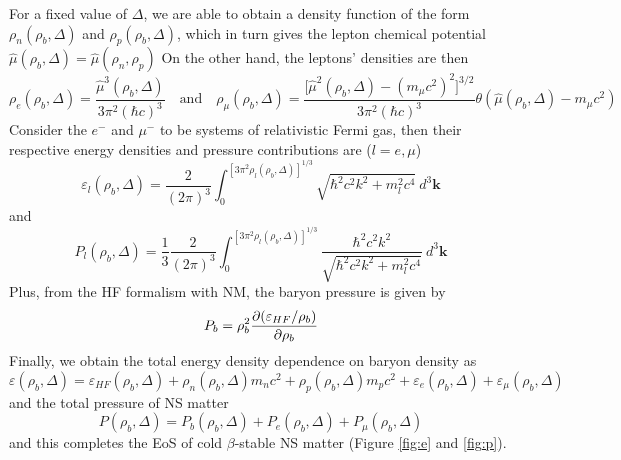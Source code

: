 For a fixed value of $\Delta$, we are able to obtain a density function of the form $\rho_n (\rho_b, \Delta)$ and $\rho_p (\rho_b, \Delta)$, which in turn gives the lepton chemical potential $\hat{\mu}(\rho_b,\Delta) = \hat{\mu}(\rho_n,\rho_p)$ On the other hand, the leptons' densities are then \cite{loan2011equation}
\begin{equation}
        \rho_e(\rho_b,\Delta) = \frac{ \hat{\mu}^3(\rho_b,\Delta)}{ 3\pi^2 (\hbar c)^3} \quad\text{and}\quad \rho_\mu(\rho_b,\Delta) = \frac{ \Big[\hat{\mu}^2(\rho_b,\Delta) - (m_\mu c^2)^2\Big]^{3/2}}{ 3\pi^2 (\hbar c)^3} \theta(\hat{\mu}(\rho_b,\Delta)-m_\mu c^2)
\end{equation} 
Consider the $e^-$ and $\mu^-$ to be systems of relativistic Fermi gas, then their respective energy densities and pressure contributions are ($l=e,\mu$) \citep{moustakidis2009equation}
\begin{equation}
        \varepsilon_l(\rho_b,\Delta) = \frac{ 2}{ (2\pi)^3} \int_{{0}}^{{[3\pi^2\rho_l(\rho_b,\Delta)]^{1/3}}} {\sqrt{\hbar^2 c^2 k^2 + m_l^2 c^4}} \: d^3{\mathbf{k}}
\end{equation} 
and
\begin{equation}
        P_l(\rho_b,\Delta) = \frac{ 1}{ 3} \frac{ 2}{ (2\pi)^3} \int_{{0}}^{{[3\pi^2 \rho_l(\rho_b,\Delta)]^{1/3}}} { \frac{ \hbar^2 c^2 k^2}{ \sqrt{\hbar^2 c^2 k^2 + m_l^2 c^4}} } \: d^3{\mathbf{k}}
\end{equation} 
Plus, from the \gls{HF} formalism with \gls{NM}, the baryon pressure is given by
\begin{equation}
        P_b = \rho_b^2 \pdv{(\varepsilon_{HF}/\rho_b)}{\rho_b}
\end{equation}
Finally, we obtain the total energy density dependence on baryon density as 
\begin{equation}
        \varepsilon(\rho_b,\Delta) = \varepsilon_{HF}(\rho_b,\Delta) + \rho_n(\rho_b,\Delta)m_n c^2 + \rho_p(\rho_b,\Delta)m_p c^2 + \varepsilon_e(\rho_b,\Delta) + \varepsilon_\mu(\rho_b,\Delta)
\end{equation}
and the total pressure of \gls{NS} matter
\begin{equation}
        P(\rho_b,\Delta) = P_b(\rho_b,\Delta) + P_e(\rho_b,\Delta) + P_\mu(\rho_b,\Delta)
\end{equation}
and this completes the \gls{EoS} of cold $\beta$-stable \gls{NS} matter (Figure \ref{fig:e} and \ref{fig:p}).
